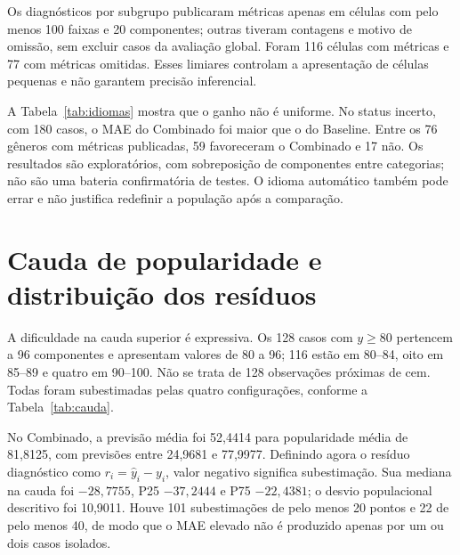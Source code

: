 Os diagnósticos por subgrupo publicaram métricas apenas em células com pelo menos 100 faixas e 20 componentes; outras tiveram contagens e motivo de omissão, sem excluir casos da avaliação global. Foram 116 células com métricas e 77 com métricas omitidas. Esses limiares controlam a apresentação de células pequenas e não garantem precisão inferencial.


A Tabela~\ref{tab:idiomas} mostra que o ganho não é uniforme. No status incerto, com 180 casos, o MAE do Combinado foi maior que o do Baseline. Entre os 76 gêneros com métricas publicadas, 59 favoreceram o Combinado e 17 não. Os resultados são exploratórios, com sobreposição de componentes entre categorias; não são uma bateria confirmatória de testes. O idioma automático também pode errar e não justifica redefinir a população após a comparação.

\FloatBarrier

\section{Cauda de popularidade e distribuição dos resíduos}
A dificuldade na cauda superior é expressiva. Os 128 casos com $y\ge80$ pertencem a 96 componentes e apresentam valores de 80 a 96; 116 estão em 80--84, oito em 85--89 e quatro em 90--100. Não se trata de 128 observações próximas de cem. Todas foram subestimadas pelas quatro configurações, conforme a Tabela~\ref{tab:cauda}.

\FloatBarrier


No Combinado, a previsão média foi 52,4414 para popularidade média de 81,8125, com previsões entre 24,9681 e 77,9977. Definindo agora o resíduo diagnóstico como $r_i=\widehat y_i-y_i$, valor negativo significa subestimação. Sua mediana na cauda foi $-28{,}7755$, P25 $-37{,}2444$ e P75 $-22{,}4381$; o desvio populacional descritivo foi 10,9011. Houve 101 subestimações de pelo menos 20 pontos e 22 de pelo menos 40, de modo que o MAE elevado não é produzido apenas por um ou dois casos isolados.

\FloatBarrier

